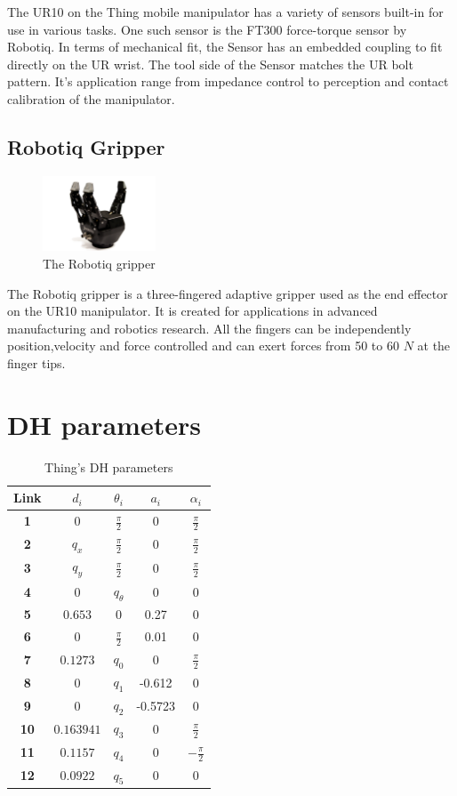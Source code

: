 \documentclass[times, utf8, diplomski, english]{fer}
\begin{document}
The UR10 on the Thing mobile manipulator has a variety of sensors built-in for use in various tasks.
One such sensor is the FT300 force-torque sensor by Robotiq.
In terms of mechanical fit, the Sensor has an embedded coupling to fit directly on the UR wrist. The tool side of the Sensor matches the UR bolt pattern. 
It's application range from impedance control to perception and contact calibration of the manipulator.


\section{Robotiq Gripper}
\begin{figure}[H]
\centering
\includegraphics[width=0.3\textwidth]{robotiq}
\caption{The Robotiq gripper}
\end{figure}
The Robotiq gripper is a three-fingered adaptive gripper used as the end effector on the UR10 manipulator.
It is created for applications in advanced manufacturing and robotics research. 
All the fingers can be independently position,velocity and force controlled and can exert forces from 50 to 60 $N$ at the finger tips.

\chapter{DH parameters}
\begin{table}[h]
\caption{Thing's DH parameters}
 \begin{tabular}{@{}ccccc@{}}
  \toprule
 \textbf{Link}& $d_i$& $\theta_i$& $a_i$ & $\alpha_i$\\ \midrule \midrule
 \textbf{1} & $0$ & $\frac{\pi}{2}$ & $0$& $\frac{\pi}{2}$\\ \midrule
 \textbf{2} & $q_x$ & $\frac{\pi}{2}$ & $0$& $\frac{\pi}{2}$\\ \midrule
 \textbf{3} & $q_y$ & $\frac{\pi}{2}$ & $0$& $\frac{\pi}{2}$\\ \midrule
 \textbf{4} & $0$ &$q_{\theta}$ & 0& 0\\ \midrule
 \textbf{5} & $0.653$ & $0$ & 0.27& 0\\ \midrule
 \textbf{6} & $0$ & $\frac{\pi}{2}$ & 0.01& 0\\ \midrule
 \textbf{7} & $0.1273$ & $q_0$ & 0& $\frac{\pi}{2}$\\ \midrule
 \textbf{8} & $0$ & $q_1$ & -0.612& 0\\ \midrule
 \textbf{9} & $0$ & $q_2$ & -0.5723& 0\\ \midrule
 \textbf{10} & $ 0.163941$ & $q_3$ & 0& $\frac{\pi}{2}$\\ \midrule
 \textbf{11} & $0.1157$ & $q_4$ & 0& $-\frac{\pi}{2}$\\ \midrule
 \textbf{12} & $0.0922$ & $q_5$ & 0& 0\\ \bottomrule
 \end{tabular}
\label{DH}
\end{table}
\end{document}
